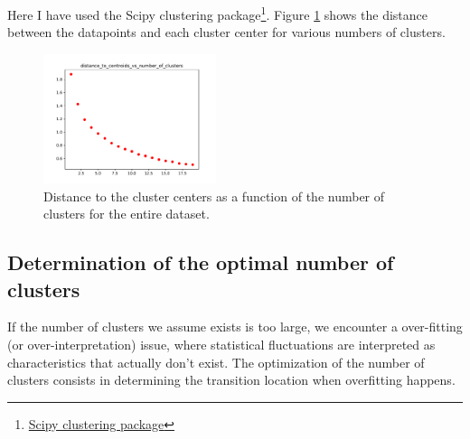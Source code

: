 \documentclass[11pt]{amsart}
\begin{document}
Here I have used the Scipy clustering package\footnote{\href{https://docs.scipy.org/doc/scipy/reference/cluster.vq.html}{Scipy clustering package}}.
Figure \ref{fig:distance_to_centroids} shows the distance between the datapoints and each cluster center for various numbers of clusters. 
\begin{figure}
    \includegraphics[width=0.45\textwidth]{../plots/distance_to_centroids_vs_number_of_clusters.pdf}
    \caption{\label{fig:distance_to_centroids} Distance to the cluster centers as a function of the number of clusters for the entire dataset.}
\end{figure}

\subsection{Determination of the optimal number of clusters} 

If the number of clusters we assume exists is too large, we encounter a over-fitting (or over-interpretation) issue, where statistical fluctuations are interpreted as characteristics that actually don't exist.
The optimization of the number of clusters consists in determining the transition location when overfitting happens.
\end{document}
